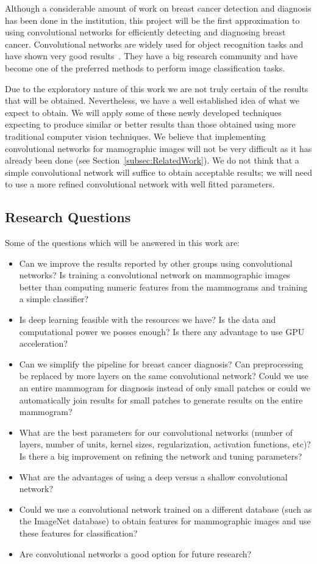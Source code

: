 Although a considerable amount of work on breast cancer detection and diagnosis has been done in the institution, this project will be the first approximation to using convolutional networks for efficiently detecting and diagnosing breast cancer. Convolutional networks are widely used for object recognition tasks and have shown very good results~\cite{Russakovsky2014, Taigman2014, Dieleman2015}. They have a big research community and have become one of the preferred methods to perform image classification tasks.%

Due to the exploratory nature of this work we are not truly certain of the results that will be obtained. Nevertheless, we have a well established idea of what we expect to obtain. We will apply some of these newly developed techniques expecting to produce similar or better results than those obtained using more traditional computer vision techniques. We believe that implementing convolutional networks for mamographic images will not be very difficult as it has already been done (see Section~\ref{subsec:RelatedWork}). We do not think that a simple convolutional network will suffice to obtain acceptable results; we will need to use a more refined convolutional network with well fitted parameters.

\subsection{Research Questions}
Some of the questions which will be answered in this work are:
\begin{itemize} 
	\item Can we improve the results reported by other groups using convolutional networks? Is training a convolutional network on mammographic images better than computing numeric features from the mammograms and training a simple classifier?
	\item Is deep learning feasible with the resources we have? Is the data and computational power we posses enough? Is there any advantage to use GPU acceleration?
	\item Can we simplify the pipeline for breast cancer diagnosis? Can preprocessing be replaced by more layers on the same convolutional network? Could we use an entire mammogram for diagnosis instead of only small patches or could we automatically join results for small patches to generate results on the entire mammogram?
	\item What are the best parameters for our convolutional networks (number of layers, number of units, kernel sizes, regularization, activation functions, etc)? Is there a big improvement on refining the network and tuning parameters?
	\item What are the advantages of using a deep versus a shallow convolutional network? 
	\item Could we use a convolutional network trained on a different database (such as the ImageNet database) to obtain features for mammographic images and use these features for classification?
	\item Are convolutional networks a good option for future research?
\end{itemize}

